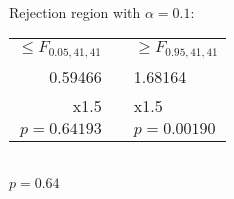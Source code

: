 \documentclass[answers]{exam}
\begin{document}
\begin{questions}
\begin{solution} \\
	Rejection region with \(\alpha=0.1\): \bigskip\\
	\begin{tabular}{rcl}
		$\leq F_{0.05,41,41}$& & $\geq F_{0.95,41,41}$ \\
		0.59466 & & 1.68164 \\
		x1.5 & & x1.5 \\
		\(p=0.64193\) & & \(p=0.00190\) \\
	\end{tabular} \bigskip\\
	\(p=0.64\)
\end{solution}

\end{questions}
\end{document}
